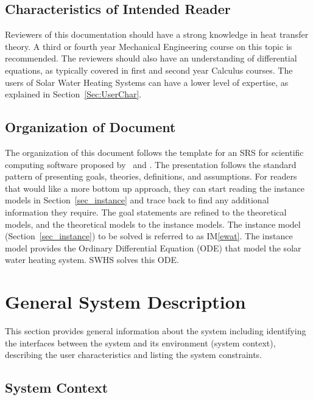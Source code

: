 \documentclass[12pt]{article}
\newcommand{\iref}[1]{IM\ref{#1}}
\begin{document}
\subsection{Characteristics of Intended Reader}
Reviewers of this documentation should have a strong knowledge in heat transfer theory. 
A third or fourth year Mechanical Engineering course on this topic is recommended. The 
reviewers should also have an understanding of differential equations, as typically 
covered in first and second year Calculus courses. The users of Solar Water Heating 
Systems can have a lower level of expertise, as explained in Section~\ref{Sec:UserChar}.

\subsection{Organization of Document}

The organization of this document follows the template for an SRS for scientific 
computing software proposed by~\cite{Koothoor2013} and \cite{SmithAndLai2005}.
The presentation follows the standard pattern of presenting goals, theories, definitions, 
and assumptions. For readers that would like a more bottom up approach, they can start 
reading the instance models in Section~\ref{sec_instance} and trace back to find any 
additional information they require. The goal statements are refined to the theoretical models, 
and the theoretical models to the instance models. The instance model 
(Section~\ref{sec_instance}) to be solved is referred to as \iref{ewat}. The instance model provides 
the Ordinary Differential Equation (ODE) that model the solar water heating system. 
SWHS solves this ODE.


\section{General System Description}

This section provides general information about the system including identifying 
the interfaces between the system and its environment (system context), describing 
the user characteristics and listing the system constraints.

\subsection{System Context}
\end{document}
